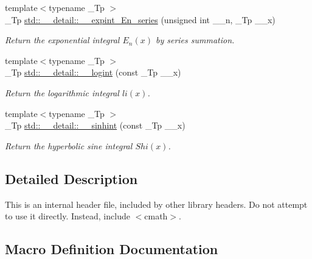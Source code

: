 \begin{DoxyCompactItemize}
{\footnotesize template$<$typename \+\_\+\+Tp $>$ }\\\+\_\+\+Tp \hyperlink{namespacestd_1_1____detail_a5c51269e411cd82ffec2e63212f76b41}{std\+::\+\_\+\+\_\+detail\+::\+\_\+\+\_\+expint\+\_\+\+En\+\_\+series} (unsigned int \+\_\+\+\_\+n, \+\_\+\+Tp \+\_\+\+\_\+x)
\begin{DoxyCompactList}\small\item\em Return the exponential integral $ E_n(x) $ by series summation. \end{DoxyCompactList}\item 
{\footnotesize template$<$typename \+\_\+\+Tp $>$ }\\\+\_\+\+Tp \hyperlink{namespacestd_1_1____detail_a4d5f8cb2b4e6e192faba9418ec14149f}{std\+::\+\_\+\+\_\+detail\+::\+\_\+\+\_\+logint} (const \+\_\+\+Tp \+\_\+\+\_\+x)
\begin{DoxyCompactList}\small\item\em Return the logarithmic integral $ li(x) $. \end{DoxyCompactList}\item 
{\footnotesize template$<$typename \+\_\+\+Tp $>$ }\\\+\_\+\+Tp \hyperlink{namespacestd_1_1____detail_ac629f9c743a716608af2007d2e34438d}{std\+::\+\_\+\+\_\+detail\+::\+\_\+\+\_\+sinhint} (const \+\_\+\+Tp \+\_\+\+\_\+x)
\begin{DoxyCompactList}\small\item\em Return the hyperbolic sine integral $ Shi(x) $. \end{DoxyCompactList}\end{DoxyCompactItemize}


\subsection{Detailed Description}
This is an internal header file, included by other library headers. Do not attempt to use it directly. Instead, include $<$cmath$>$. 

\subsection{Macro Definition Documentation}
\mbox{\label{sf__expint_8tcc_a1dd7ac46e3e1d856c4d1abb21192f01a}} 
